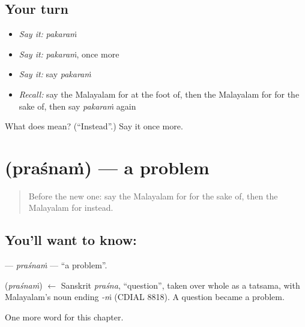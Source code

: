 \subsection*{Your turn}
\begin{itemize}
\raggedright
  \item \emph{Say it:} \emph{pakaraṁ}
  \item \emph{Say it:} \emph{pakaraṁ}, once more
  \item \emph{Say it:} say \emph{pakaraṁ}
  \item \emph{Recall:} say the Malayalam for at the foot of, then the Malayalam for for the sake of, then say \emph{pakaraṁ} again
\end{itemize}

\begin{tcolorbox}[breakable,colback=teal!4,colframe=teal!35!black,title={Before you move on}]
What does  mean? (\textquotedblleft{}Instead\textquotedblright{}.) Say it once more.
\end{tcolorbox}
\section[\texorpdfstring{\ml{പ്രശ്നം} (praśnaṁ)}{പ്രശ്നം (praśnaṁ)}]{ (praśnaṁ) — a problem}

\label{lesson:ML-C200-prasnam}



\begin{quote}
Before the new one: say the Malayalam for for the sake of, then the Malayalam for instead.
\end{quote}

\subsection*{You'll want to know: }
\textbf{} — \emph{praśnaṁ} — \textquotedblleft{}a problem\textquotedblright{}.

\begin{cousinweb}
\textbf{} (\emph{praśnaṁ}) $\leftarrow$ Sanskrit \emph{praśna}, \textquotedblleft{}question\textquotedblright{}, taken over whole as a tatsama, with Malayalam's noun ending \emph{-ṁ} (CDIAL 8818). A question became a problem.
\end{cousinweb}

\begin{grammarlens}[title={What you've built}]
One more word for this chapter.
\end{grammarlens}

